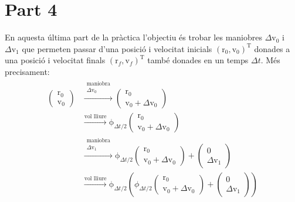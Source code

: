 \documentclass[10pt,a4paper]{article}
\newcommand{\vf}[1]{\boldsymbol{\mathrm{#1}}} %
\theoremstyle{definition}
\theoremstyle{remark}
\begin{document}
\section*{Part 4}
En aquesta última part de la pràctica l'objectiu és trobar les maniobres $\Delta \vf{v}_0$ i $\Delta \vf{v}_1$ que permeten passar d'una posició i velocitat inicials ${(\vf{r}_0,\vf{v}_0)}^\mathrm{T}$ donades a una posició i velocitat finals ${(\vf{r}_f,\vf{v}_f)}^\mathrm{T}$ també donades en un temps $\Delta t$. Més precisament:
\begin{align*}
  \begin{pmatrix}
    \vf{r}_0 \\
    \vf{v}_0
  \end{pmatrix} & \overset{\substack{\text{maniobra}   \\\Delta\vf{v}_0}}{\longrightarrow}
  \begin{pmatrix}
    \vf{r}_0 \\
    \vf{v}_0 + \Delta\vf{v}_0
  \end{pmatrix}                             \\ & \overset{\text{vol lliure}}{\longrightarrow}\vf\phi_{\Delta t/2}\begin{pmatrix}
    \vf{r}_0 \\
    \vf{v}_0 + \Delta\vf{v}_0
  \end{pmatrix}\\
                  & \overset{\substack{\text{maniobra} \\\Delta\vf{v}_1}}{\longrightarrow}
  \vf\phi_{\Delta t/2}\begin{pmatrix}
                        \vf{r}_0 \\
                        \vf{v}_0 + \Delta\vf{v}_0
                      \end{pmatrix}+\begin{pmatrix}
                                      \vf{0} \\
                                      \Delta\vf{v}_1
                                    \end{pmatrix}     \\ & \overset{\text{vol lliure}}{\longrightarrow}\vf\phi_{\Delta t/2}\left(\phi_{\Delta t/2}\begin{pmatrix}
    \vf{r}_0 \\
    \vf{v}_0 + \Delta\vf{v}_0
  \end{pmatrix}+\begin{pmatrix}
    \vf{0} \\
    \Delta\vf{v}_1
  \end{pmatrix}\right)\\
\end{align*}
\end{document}

